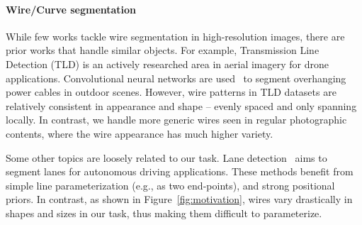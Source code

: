 \paragraph{Wire/Curve segmentation}
While few works tackle wire segmentation in high-resolution images, there are prior works that handle similar objects. For example, Transmission Line Detection (TLD) is an actively researched area in aerial imagery for drone applications. Convolutional neural networks are used~\cite{ttpla, pldu, cable_inst, lsnet} to segment overhanging power cables in outdoor scenes. However, wire patterns in TLD datasets are relatively consistent in appearance and shape -- evenly spaced and only spanning locally. In contrast, we handle more generic wires seen in regular photographic contents, where the wire appearance has much higher variety. 

Some other topics are loosely related to our task. Lane detection~\cite{lanedet,swiftlane,structurelane} aims to segment lanes for autonomous driving applications. These methods benefit from simple line parameterization (e.g., as two end-points), and strong positional priors. In contrast, as shown in Figure~\ref{fig:motivation}, wires vary drastically in shapes and sizes in our task, thus making them difficult to parameterize.

\vspace{-5mm}
